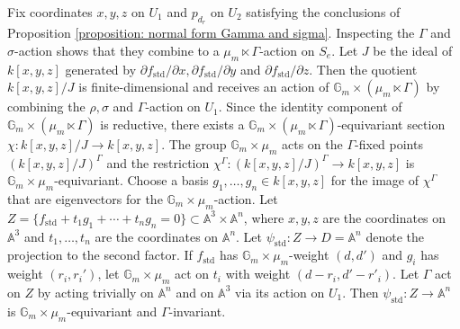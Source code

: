 \documentclass{article} %
\numberwithin{equation}{section}
\theoremstyle{definition}
\newcommand{\G}{\mathbb{G}}
\newcommand{\A}{\mathbb{A}}
\begin{document}
Fix coordinates $x,y,z$ on $U_1$ and $p_{d_r}$ on $U_2$ satisfying the conclusions of Proposition \ref{proposition: normal form Gamma and sigma}.
Inspecting the $\Gamma$ and $\sigma$-action shows that they combine to a $\mu_m \ltimes \Gamma$-action on $S_e$. 
Let $J$ be the ideal of $k[x,y,z]$ generated by $\partial f_{\mathrm{std}}/\partial x, \partial f_{\mathrm{std}}/\partial y$ and $\partial f_{\mathrm{std}}/\partial z$.
Then the quotient $k[x,y,z]/J$ is finite-dimensional and receives an action of $\G_m\times (\mu_m \ltimes \Gamma)$ by combining the $\rho, \sigma$ and $\Gamma$-action on $U_1$.
Since the identity component of $\G_m\times (\mu_m \ltimes \Gamma)$ is reductive, there exists a $\G_m \times(\mu_m\ltimes \Gamma)$-equivariant section $\chi\colon k[x,y,z]/J \rightarrow k[x,y,z]$.
The group $\G_m \times \mu_m$ acts on the $\Gamma$-fixed points $(k[x,y,z]/J)^{\Gamma}$ and the restriction $\chi^{\Gamma}\colon (k[x,y,z]/J)^{\Gamma}\rightarrow k[x,y,z]$ is $\G_m\times \mu_m$-equivariant.
Choose a basis $g_1, \dots, g_{n}\in k[x,y,z]$ for the image of $\chi^\Gamma$ that are eigenvectors for the $\G_m\times \mu_m$-action.
Let $Z = \{f_{\mathrm{std}} + t_1 g_1 + \cdots + t_n g_n = 0\}\subset \A^3 \times \A^n$, where $x,y,z$ are the coordinates on $\A^3$ and $t_1, \dots, t_n$ are the coordinates on $\A^n$. 
Let $\psi_{\mathrm{std}}\colon Z\rightarrow D = \A^n$ denote the projection to the second factor.
If $f_{\mathrm{std}}$ has $\G_m\times \mu_m$-weight $(d,d')$ and $g_i$ has weight $(r_i,r_i')$, let $\G_m\times \mu_m$ act on $t_i$ with weight $(d-r_i, d'-r'_i)$. 
Let $\Gamma$ act on $Z$ by acting trivially on $\A^n$ and on $\A^3$ via its action on $U_1$.
Then $\psi_{\mathrm{std}} \colon Z\rightarrow \A^n$ is $\G_m\times \mu_m$-equivariant and $\Gamma$-invariant.
\end{document}

